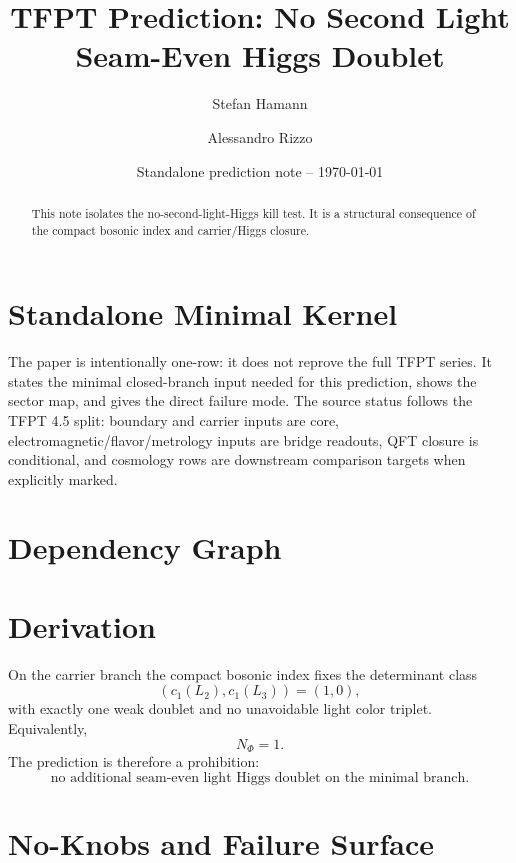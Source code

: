 \documentclass[11pt,a4paper]{article}
\title{\color{tfptblue}\textbf{TFPT Prediction: No Second Light Seam-Even Higgs Doublet}}
\author{Stefan Hamann \and Alessandro Rizzo}
\date{{\normalsize\color{tfptgray}\sffamily Standalone prediction note -- \today}}
\begin{document}
\maketitle

\begin{abstract}
This note isolates the no-second-light-Higgs kill test. It is a structural consequence of the compact bosonic index and carrier/Higgs closure.
\end{abstract}



\section{Standalone Minimal Kernel}
\MinimalKernelBox

The paper is intentionally one-row: it does not reprove the full TFPT series. It states the minimal closed-branch input needed for this prediction, shows the sector map, and gives the direct failure mode. The source status follows the TFPT 4.5 split: boundary and carrier inputs are core, electromagnetic/flavor/metrology inputs are bridge readouts, QFT closure is conditional, and cosmology rows are downstream comparison targets when explicitly marked.


\section{Dependency Graph}

\section{Derivation}

On the carrier branch the compact bosonic index fixes the determinant class
\[
(c_1(L_2),c_1(L_3))=(1,0),
\]
with exactly one weak doublet and no unavoidable light color triplet. Equivalently,
\[
N_\Phi=1.
\]
The prediction is therefore a prohibition:
\[
\text{no additional seam-even light Higgs doublet on the minimal branch.}
\]


\section{No-Knobs and Failure Surface}
\end{document}
